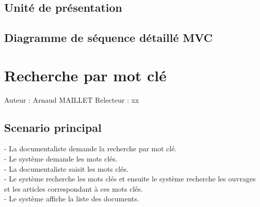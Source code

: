 \documentclass[a4paper,10pt]{report}
\begin{document}
\newpage

\section*{Unité de présentation}

\section*{Diagramme de séquence détaillé MVC}

\newpage


\chapter*{Recherche par mot clé}

Auteur : Arnaud MAILLET
Relecteur : xx

\bigskip
\section*{Scenario principal}
\begin{flushleft}
- La documentaliste demande la recherche par mot clé.\\
- Le système demande les mots clés.\\
- La documentaliste saisit les mots clés.\\
- Le système recherche les mots clés et ensuite le système recherche les ouvrages et les articles correspondant à ces mots clés.\\
- Le système affiche la liste des documents.\\
\end{flushleft}

\bigskip
\end{document}
